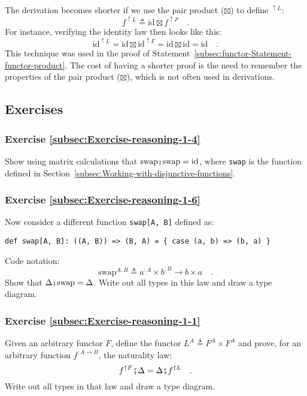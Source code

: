 The derivation becomes shorter if we use the pair product ($\boxtimes$)
to define $^{\uparrow L}$:
\[
f^{\uparrow L}\triangleq\text{id}\boxtimes f^{\uparrow F}\quad.
\]
For instance, verifying the identity law then looks like this:
\[
\text{id}^{\uparrow L}=\text{id}\boxtimes\text{id}^{\uparrow F}=\text{id}\boxtimes\text{id}=\text{id}\quad.
\]
This technique was used in the proof of Statement~\ref{subsec:functor-Statement-functor-product}.
The cost of having a shorter proof is the need to remember the properties
of the pair product ($\boxtimes$), which is not often used in derivations.

\subsection{Exercises}

\subsubsection{Exercise \label{subsec:Exercise-reasoning-1-4}\ref{subsec:Exercise-reasoning-1-4}}

Show using matrix calculations that $\text{swap}\bef\text{swap}=\text{id}$,
where \lstinline!swap! is the function defined in Section~\ref{subsec:Working-with-disjunctive-functions}.

\subsubsection{Exercise \label{subsec:Exercise-reasoning-1-6}\ref{subsec:Exercise-reasoning-1-6}}

Now consider a different function \lstinline!swap[A, B]! defined
as:
\begin{lstlisting}
def swap[A, B]: ((A, B)) => (B, A) = { case (a, b) => (b, a) }
\end{lstlisting}
Code notation:
\[
\text{swap}^{A,B}\triangleq a^{:A}\times b^{:B}\rightarrow b\times a\quad.
\]
Show that $\Delta\bef\text{swap}=\Delta$. Write out all types in
this law and draw a type diagram.

\subsubsection{Exercise \label{subsec:Exercise-reasoning-1-1}\ref{subsec:Exercise-reasoning-1-1}}

Given an arbitrary functor $F$, define the functor $L^{A}\triangleq F^{A}\times F^{A}$
and prove, for an arbitrary function $f^{:A\rightarrow B}$, the naturality
law:
\[
f^{\uparrow F}\bef\Delta=\Delta\bef f^{\uparrow L}\quad.
\]
Write out all types in that law and draw a type diagram.

